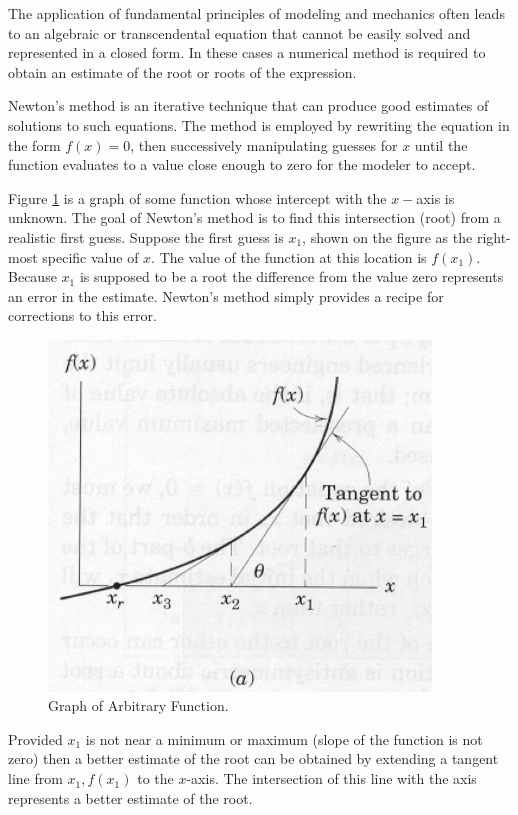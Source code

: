 The application of fundamental principles of modeling and mechanics often leads to an algebraic or transcendental equation that cannot be easily solved and represented in a closed form.  
In these cases a numerical method is required to obtain an estimate of the root or roots of the expression.  

Newton's method is an iterative technique that can produce good estimates of solutions to such equations.  
The method is employed by rewriting the equation in the form $f(x)=0$, then successively manipulating guesses for $x$ until the function evaluates to a value close enough to zero for the modeler to accept.
  
Figure \ref{fig:ArbitraryFunction} is a graph of some function whose intercept with the $x-$axis is unknown.  
The goal of Newton's method is to find this intersection (root) from a realistic first guess.  
Suppose the first guess is $x_1$, shown on the figure as the right-most specific value of $x$. 
The value of the function at this location is $f(x_1)$.  
Because $x_1$ is supposed to be a root the difference from the value zero represents an error in the estimate.  
Newton's method simply provides a recipe for corrections to this error.  

\begin{figure}[h!] %
   \centering
   \includegraphics[width=4in]{./3-Differentation/ArbitraryFunction.jpg} 
   \caption{Graph of Arbitrary Function.}
   \label{fig:ArbitraryFunction}
\end{figure}

Provided $x_1$ is not near a minimum or maximum (slope of the function is not zero) then a better estimate of the root can be obtained by extending a tangent line from $x_1,f(x_1)$ to the $x$-axis.  
The intersection of this line with the axis represents a better estimate of the root.


